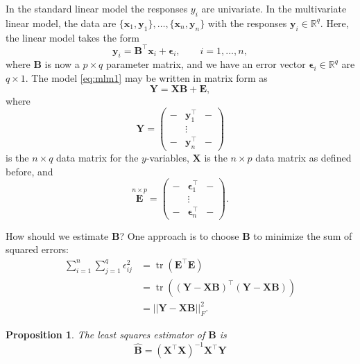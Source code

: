 \documentclass[
]{book}
\newtheorem{proposition}{Proposition}[chapter]
\theoremstyle{definition}
\theoremstyle{definition}
\theoremstyle{definition}
\theoremstyle{definition}
\theoremstyle{remark}
\begin{document}
In the standard linear model the responses \(y_i\) are univariate. In the multivariate linear model, the data are \(\{\mathbf x_1, \mathbf y_1\}, \ldots, \{\mathbf x_n, \mathbf y_n\}\) with the responses \(\mathbf y_i \in \mathbb{R}^q\). Here, the linear model takes the form
\begin{equation}
\mathbf y_i= \mathbf B^\top \mathbf x_i +{\pmb \epsilon}_i, \qquad i=1, \ldots , n,
\label{eq:mlm1}
\end{equation}
where \(\mathbf B\) is now a \(p \times q\) parameter matrix, and we have an error vector \({\pmb \epsilon}_i\in \mathbb{R}^q\) are \(q \times 1\). The model \eqref{eq:mlm1} may be written in matrix form as
\begin{equation}
\mathbf Y= \mathbf X\mathbf B+\mathbf E,
\label{eq:mlm2}
\end{equation}
where \[\mathbf Y=
\begin{pmatrix} - & \mathbf y_1^\top &-\\
&\vdots&\\
-&\mathbf y_n^\top&-\end{pmatrix}\] is the \(n \times q\) data matrix for the \(y\)-variables, \(\mathbf X\) is the \(n \times p\) data matrix as defined before, and \[\stackrel{n \times p}{\mathbf E}=\begin{pmatrix} - & \boldsymbol \epsilon_1^\top &-\\
&\vdots&\\
-&\boldsymbol \epsilon_n^\top&-\end{pmatrix}.\]

How should we estimate \(\mathbf B\)? One approach is to choose \(\mathbf B\) to minimize the sum of squared errors:
\begin{align}\sum_{i=1}^n\sum_{j=1}^q \epsilon_{ij}^2 &= \operatorname{tr}(\mathbf E^\top \mathbf E) \\
&= \operatorname{tr}((\mathbf Y-\mathbf X\mathbf B)^\top(\mathbf Y-\mathbf X\mathbf B))\\
&=||\mathbf Y-\mathbf X\mathbf B||_F^2.
\end{align}

\begin{proposition}
\protect\hypertarget{prp:eight1}{}\label{prp:eight1}The least squares estimator of \(\mathbf B\) is
\begin{equation}
\hat{\mathbf B}= (\mathbf X^\top \mathbf X)^{-1}\mathbf X^\top \mathbf Y
\label{eq:MVbeta}
\end{equation}
\end{proposition}
\end{document}
